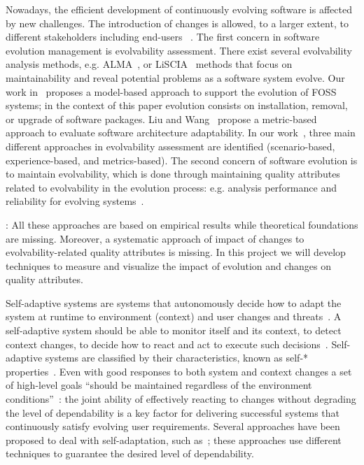 \documentclass[12pt]{article}
\begin{document}
Nowadays, the efficient development of continuously evolving software is affected by new challenges.
The introduction of changes is allowed, to a larger extent, to different stakeholders including end-users%
~\cite{Mens2005,Baresi06}. The first concern in software evolution management is evolvability assessment. There exist several evolvability analysis methods, e.g. ALMA~\cite{Bengtsson2004}, or LiSCIA~\cite{BD10} methods that focus on maintainability and reveal potential problems as a software system evolve. Our work in~\cite{DiCosmo2011,DiRuscio2014,DiRuscio2015} proposes a model-based approach to support the evolution of FOSS systems; in the context of this paper evolution consists on installation, removal, or upgrade of software packages. %
Liu and Wang~\cite{LW05} propose a metric-based approach to evaluate software architecture adaptability. In our work~\cite{PCM12}, three main different approaches in evolvability assessment are identified (scenario-based, experience-based, and metrics-based). 
The second concern of software evolution is to maintain evolvability, which is done through maintaining quality attributes related to evolvability in the evolution process:  e.g. analysis performance and reliability for evolving systems~\cite{Koziolek2012}. 

: All these approaches are based on empirical results while theoretical foundations are missing. Moreover, a systematic approach of impact of changes to evolvability-related quality attributes is  missing. In this project we will develop techniques to measure and visualize the impact of evolution and changes on quality attributes. 

Self-adaptive systems are systems that autonomously decide how to adapt the system at runtime to environment (context) and user changes and threats~\cite{BSG09,DG13}. A self-adaptive system should be able to monitor itself and its context, to detect context changes, to decide how to react and act to execute such decisions~\cite{ST09}. Self-adaptive systems are classified by their characteristics, known as self-* properties~\cite{KC03,BJM05}. Even with good responses to both system and context changes a set of high-level goals ``should be maintained regardless of the environment conditions''~\cite{CG08}: the joint ability of effectively reacting to changes without degrading the level of dependability is a key factor for delivering successful systems that continuously satisfy evolving user requirements. Several approaches have been proposed to deal with self-adaptation, such as~\cite{terBeek2015,BE10,BA12,Bucchiarone2015}; these approaches use different techniques to guarantee the desired level of dependability.
\end{document}
